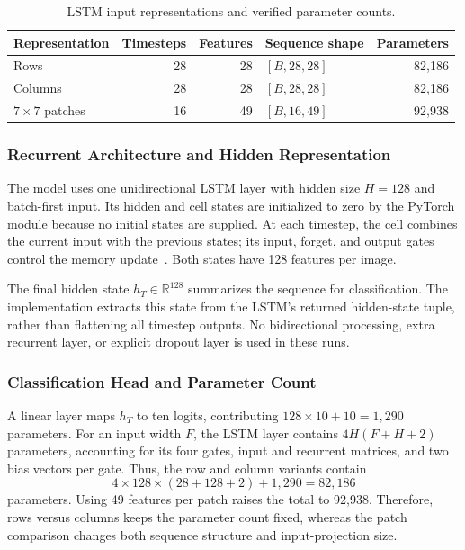\begin{table}[H]
    \centering
    \caption{LSTM input representations and verified parameter counts.}
    \label{tab:a1-lstm-inputs}
    \begin{tabular}{@{}lrrlr@{}}
        \toprule
        Representation & Timesteps & Features & Sequence shape & Parameters \\
        \midrule
        Rows & 28 & 28 & $[B,28,28]$ & 82,186 \\
        Columns & 28 & 28 & $[B,28,28]$ & 82,186 \\
        $7\times7$ patches & 16 & 49 & $[B,16,49]$ & 92,938 \\
        \bottomrule
    \end{tabular}
\end{table}

\subsubsection{Recurrent Architecture and Hidden Representation}

The model uses one unidirectional LSTM layer with hidden size $H=128$ and batch-first input. Its hidden and cell states are initialized to zero by the PyTorch module because no initial states are supplied. At each timestep, the cell combines the current input with the previous states; its input, forget, and output gates control the memory update~\cite{pytorch-lstm}. Both states have 128 features per image.

The final hidden state $h_T\in\mathbb{R}^{128}$ summarizes the sequence for classification. The implementation extracts this state from the LSTM's returned hidden-state tuple, rather than flattening all timestep outputs. No bidirectional processing, extra recurrent layer, or explicit dropout layer is used in these runs.

\subsubsection{Classification Head and Parameter Count}

A linear layer maps $h_T$ to ten logits, contributing $128\times10+10=1{,}290$ parameters. For an input width $F$, the LSTM layer contains $4H(F+H+2)$ parameters, accounting for its four gates, input and recurrent matrices, and two bias vectors per gate. Thus, the row and column variants contain
\begin{equation}
    4\times128\times(28+128+2)+1{,}290=82{,}186
\end{equation}
parameters. Using 49 features per patch raises the total to 92,938. Therefore, rows versus columns keeps the parameter count fixed, whereas the patch comparison changes both sequence structure and input-projection size.

